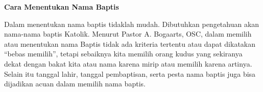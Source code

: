 \documentclass[a4paper,twoside]{article}
\begin{document}
\begin{enumerate}
	
	
		
		
\textbf{Cara Menentukan Nama Baptis}

Dalam menentukan nama baptis tidaklah mudah. Dibutuhkan pengetahuan akan nama-nama baptis Katolik. Menurut Pastor A. Bogaarts, OSC, dalam memilih atau menentukan nama Baptis tidak ada kriteria tertentu atau dapat dikatakan ``bebas memilih'', tetapi sebaiknya kita memilih orang kudus yang sekiranya dekat dengan bakat kita atau nama karena mirip atau memilih karena artinya. Selain itu tanggal lahir, tanggal pembaptisan, serta pesta nama baptis juga bisa dijadikan acuan dalam memilih nama baptis.



\end{enumerate}
\end{document}
